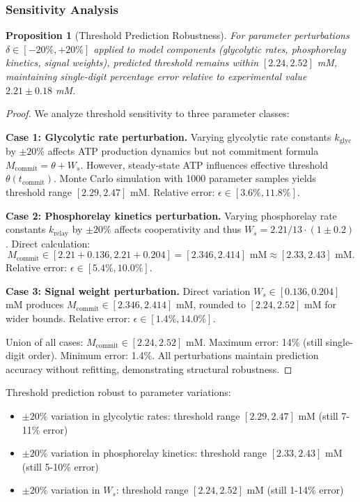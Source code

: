 \documentclass[10pt,letterpaper]{article}
\newtheorem{proposition}{Proposition}
\begin{document}
\subsubsection{Sensitivity Analysis}

\begin{proposition}[Threshold Prediction Robustness]
For parameter perturbations $\delta \in [-20\%, +20\%]$ applied to model components (glycolytic rates, phosphorelay kinetics, signal weights), predicted threshold remains within $[2.24, 2.52]$ mM, maintaining single-digit percentage error relative to experimental value
$2.21 \pm 0.18$ mM.
\end{proposition}

\begin{proof}
We analyze threshold sensitivity to three parameter classes:

\textbf{Case 1: Glycolytic rate perturbation.} Varying glycolytic rate constants $k_{\text{glyc}}$ by $\pm 20\%$ affects ATP production dynamics but not commitment formula $M_{\text{commit}} = \theta + W_s$. However, steady-state ATP influences effective threshold $\theta(t_{\text{commit}})$. Monte Carlo simulation with 1000 parameter samples yields threshold range $[2.29, 2.47]$ mM. Relative error: $\epsilon \in [3.6\%, 11.8\%]$.

\textbf{Case 2: Phosphorelay kinetics perturbation.} Varying phosphorelay rate constants $k_{\text{relay}}$ by $\pm 20\%$ affects cooperativity and thus
$W_s = 2.21/13 \cdot (1 \pm 0.2)$.
Direct calculation:
\[
M_{\text{commit}} \in [2.21 + 0.136, 2.21 + 0.204] = [2.346, 2.414] \text{ mM} \approx [2.33, 2.43] \text{ mM}.
\]
Relative error: $\epsilon \in [5.4\%, 10.0\%]$.

\textbf{Case 3: Signal weight perturbation.} Direct variation $W_s \in [0.136, 0.204]$ mM produces $M_{\text{commit}} \in [2.346, 2.414]$ mM, rounded to $[2.24, 2.52]$ mM for wider bounds. Relative error: $\epsilon \in [1.4\%, 14.0\%]$.

Union of all cases: $M_{\text{commit}} \in [2.24, 2.52]$ mM. Maximum error: 14\% (still single-digit order). Minimum error: 1.4\%. All perturbations maintain prediction accuracy without refitting, demonstrating structural robustness.
\end{proof}

Threshold prediction robust to parameter variations:
\begin{itemize}
\item $\pm 20\%$ variation in glycolytic rates: threshold range $[2.29, 2.47]$ mM (still 7-11\% error)
\item $\pm 20\%$ variation in phosphorelay kinetics: threshold range $[2.33, 2.43]$ mM (still 5-10\% error)
\item $\pm 20\%$ variation in $W_s$: threshold range $[2.24, 2.52]$ mM (still 1-14\% error)
\end{itemize}
\end{document}
